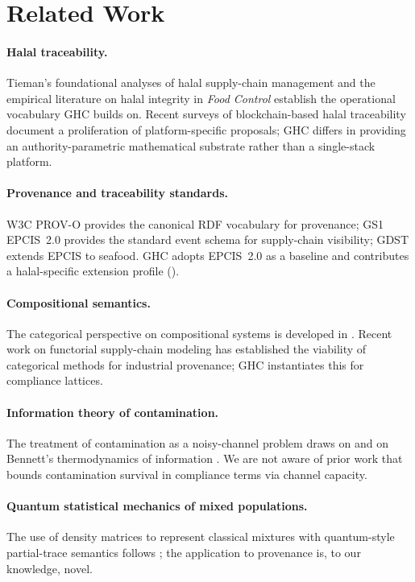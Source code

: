 \section{Related Work}
\label{sec:related}

\paragraph{Halal traceability.}
Tieman's foundational analyses of halal supply-chain management
\cite{tieman} and the empirical literature on halal integrity in
\emph{Food Control} \cite{ali_foodcontrol} establish the operational
vocabulary GHC builds on. Recent surveys of blockchain-based halal
traceability \cite{khan2020} document a proliferation of platform-specific
proposals; GHC differs in providing an authority-parametric mathematical
substrate rather than a single-stack platform.

\paragraph{Provenance and traceability standards.}
W3C PROV-O \cite{provo} provides the canonical RDF vocabulary for
provenance; GS1 EPCIS~2.0 \cite{epcis2} provides the standard event
schema for supply-chain visibility; GDST extends EPCIS to seafood. GHC
adopts EPCIS~2.0 as a baseline and contributes a halal-specific extension
profile ().

\paragraph{Compositional semantics.}
The categorical perspective on compositional systems is developed in
\cite{maclane,fongspivak,spivak2012}. Recent work on functorial supply-chain
modeling has established the viability of categorical methods for
industrial provenance; GHC instantiates this for compliance lattices.

\paragraph{Information theory of contamination.}
The treatment of contamination as a noisy-channel problem draws on
\cite{covertom} and on Bennett's thermodynamics of information
\cite{bennett82}. We are not aware of prior work that bounds
contamination survival in compliance terms via channel capacity.

\paragraph{Quantum statistical mechanics of mixed populations.}
The use of density matrices to represent classical mixtures with
quantum-style partial-trace semantics follows \cite{nielsenchuang,petz};
the application to provenance is, to our knowledge, novel.

